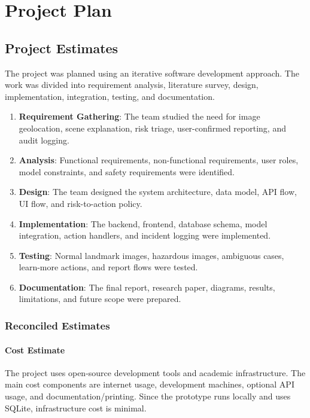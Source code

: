 \chapter{Project Plan}

\section{Project Estimates}
The project was planned using an iterative software development approach. The work was divided into requirement analysis, literature survey, design, implementation, integration, testing, and documentation.

\begin{enumerate}
\item \textbf{Requirement Gathering}: The team studied the need for image geolocation, scene explanation, risk triage, user-confirmed reporting, and audit logging.
\item \textbf{Analysis}: Functional requirements, non-functional requirements, user roles, model constraints, and safety requirements were identified.
\item \textbf{Design}: The team designed the system architecture, data model, API flow, UI flow, and risk-to-action policy.
\item \textbf{Implementation}: The backend, frontend, database schema, model integration, action handlers, and incident logging were implemented.
\item \textbf{Testing}: Normal landmark images, hazardous images, ambiguous cases, learn-more actions, and report flows were tested.
\item \textbf{Documentation}: The final report, research paper, diagrams, results, limitations, and future scope were prepared.
\end{enumerate}

\subsection{Reconciled Estimates}
\subsubsection{Cost Estimate}
The project uses open-source development tools and academic infrastructure. The main cost components are internet usage, development machines, optional API usage, and documentation/printing. Since the prototype runs locally and uses SQLite, infrastructure cost is minimal.

